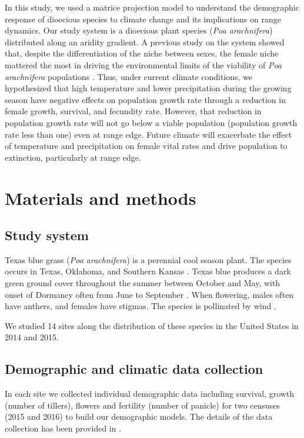 \documentclass[11pt]{article}
\begin{document}
In this study, we used a matrice projection model to understand the demographic response of dioecious species to climate change and its implications on range dynamics.
Our study system is a dioecious plant species (\textit{Poa arachnifera}) distributed along an aridity gradient. 
A previous study on the system showed that, despite the differentiation of the niche between sexes, the female niche mattered the most in driving the environmental limits of the viability of \textit {Poa arachnifera} populations \citep{miller2022two}. 
Thus, under current climate conditions, we hypothesized that high temperature and lower precipitation during the growing season have negative effects on population growth rate through a reduction in female growth, survival, and fecundity rate. However, that reduction in population growth rate will not go below a viable population (population growth rate less than one) even at range edge. Future climate will exacerbate the effect of temperature and precipitation on female vital rates and drive population to extinction, particularly at range edge.


\section*{Materials and methods}

\subsection*{Study system}
Texas blue grass (\textit{Poa arachnifera}) is a perennial cool season plant. 
The species occurs in Texas, Oklahoma, and Southern Kansas \citep{hitchcock1971manual}. 
Texas blue produces a dark green ground cover throughout the summer between October and May, with onset of Dormancy often from June to September \citep{kindiger2004interspecific}.
When flowering, males often have anthers, and females have stigmas. The species is pollinated by wind \citep{hitchcock1971manual}.

We studied 14 sites along the distribution of these species in the United States in 2014 and 2015. 

\subsection*{Demographic and climatic data collection}
In each site we collected individual demographic data including survival, growth (number of tillers), flowers and fertility (number of panicle) for two censuses (2015 and 2016) to build our demographic models.
The details of the data collection has been provided in \cite{miller2022two}. 
\end{document}
